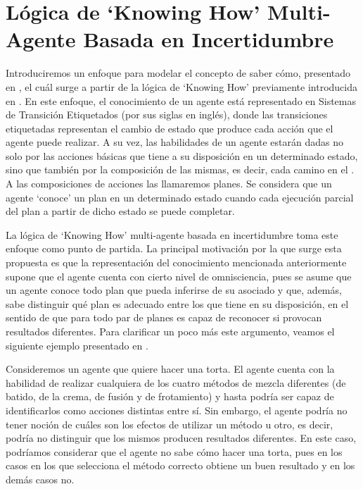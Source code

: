 \chapter{Lógica de `Knowing How' Multi-Agente Basada en Incertidumbre}
Introduciremos un enfoque para modelar el concepto de saber cómo, presentado en \cite{ArecesFSV25,SaraviaPHD}, el cuál surge a partir de la 
lógica de `Knowing How' previamente introducida en \cite{Wang15KH, Wang2018GoalDirectedKH}. En este enfoque, el conocimiento de un agente está 
representado en Sistemas de Transición Etiquetados (\lts por sus siglas en inglés), donde las transiciones etiquetadas representan el cambio de estado 
que produce cada acción que el agente puede realizar. A su vez, las habilidades de un agente estarán dadas no solo por las acciones básicas que tiene a 
su disposición en un determinado estado, sino que también por la composición de las mismas, es decir, cada camino en el \lts. A las composiciones de acciones las 
llamaremos planes. Se considera que un agente `conoce' un plan en un determinado estado cuando cada ejecución parcial del plan a partir de dicho estado se puede 
completar.

La lógica de `Knowing How' multi-agente basada en incertidumbre toma este enfoque como punto de partida. La principal motivación por la que 
surge esta propuesta es que la representación del conocimiento mencionada anteriormente supone que el agente cuenta con cierto nivel de omnisciencia, 
pues se asume que un agente conoce todo plan que pueda inferirse de su \lts asociado y que, además, sabe distinguir qué plan es adecuado entre los que tiene en su 
disposición, en el sentido de que para todo par de planes es capaz de reconocer si provocan resultados diferentes.
Para clarificar un poco más este argumento, veamos el siguiente ejemplo presentado en \cite{ArecesFSV25,SaraviaPHD}.

Consideremos un agente que quiere hacer una torta. El agente cuenta con la habilidad de realizar cualquiera de los cuatro métodos de mezcla diferentes 
(de batido, de la crema, de fusión y de frotamiento) y hasta podría ser capaz de identificarlos como acciones distintas entre sí. Sin embargo, 
el agente podría no tener noción de cuáles son los efectos de utilizar un método u otro, es decir, podría no distinguir que los mismos producen resultados 
diferentes. En este caso, podríamos considerar que el agente no sabe cómo hacer una torta, pues en los casos en los que selecciona el método correcto obtiene 
un buen resultado y en los demás casos no. 

